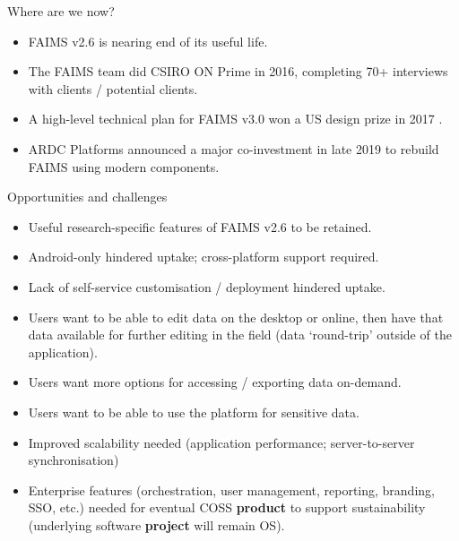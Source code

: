 \documentclass[
	aspectratio=169, %
	12pt, %
	t, %
]{beamer}
\begin{document}
\begin{refsegment}
\begin{frame}{Where are we now?}
    \begin{itemize}
        \item FAIMS v2.6 is nearing end of its useful life.
        \item The FAIMS team did CSIRO ON Prime in 2016, completing 70+ interviews with clients / potential clients.
        \item A high-level technical plan for FAIMS v3.0 won a US design prize in 2017 \parencite{Bureau_of_Reclamation2017-xl}.
        \item ARDC Platforms announced a major co-investment in late 2019 to rebuild FAIMS using modern components.
    \end{itemize}
\end{frame}


\begin{frame}{Opportunities and challenges}
    \begin{itemize}
        \item Useful research-specific features of FAIMS v2.6 to be retained.
        \item Android-only hindered uptake; cross-platform support required.
        \item Lack of self-service customisation / deployment hindered uptake.
        \item Users want to be able to edit data on the desktop or online, then have that data available for further editing in the field (data `round-trip' outside of the application).
        \item Users want more options for accessing / exporting data on-demand.
        \item Users want to be able to use the platform for sensitive data. 
        \item Improved scalability needed (application performance; server-to-server synchronisation)
        \item Enterprise features (orchestration, user management, reporting, branding, SSO, etc.) needed for eventual COSS \textbf{product} to support sustainability (underlying software \textbf{project} will remain OS).
    \end{itemize}
\end{frame}


\end{refsegment}
\end{document}
